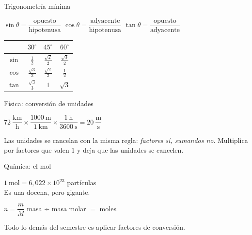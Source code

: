 \documentclass[12pt]{article}
\begin{document}
\begin{mwcarlamina}{Trigonometría mínima}
\begin{cajateoria}
  \centering
  $\sin\theta = \dfrac{\text{opuesto}}{\text{hipotenusa}}$\quad
  $\cos\theta = \dfrac{\text{adyacente}}{\text{hipotenusa}}$\quad
  $\tan\theta = \dfrac{\text{opuesto}}{\text{adyacente}}$
\end{cajateoria}
\begin{cajaformula}
  \centering\small
  \begin{tabular}{c|ccc}
    & $30^\circ$ & $45^\circ$ & $60^\circ$\\\hline
    $\sin$ & $\tfrac12$ & $\tfrac{\sqrt2}{2}$ & $\tfrac{\sqrt3}{2}$\\
    $\cos$ & $\tfrac{\sqrt3}{2}$ & $\tfrac{\sqrt2}{2}$ & $\tfrac12$\\
    $\tan$ & $\tfrac{\sqrt3}{3}$ & $1$ & $\sqrt3$
  \end{tabular}
\end{cajaformula}
\end{mwcarlamina}

\begin{mwcarlamina}{Física: conversión de unidades}
\begin{cajapasos}
  \centering
  $72\ \dfrac{\text{km}}{\text{h}} \times
   \dfrac{1000\ \text{m}}{1\ \text{km}} \times
   \dfrac{1\ \text{h}}{3600\ \text{s}} =
   20\ \dfrac{\text{m}}{\text{s}}$
\end{cajapasos}
\begin{cajateoria}
  \small Las unidades se cancelan con la misma regla:
  \emph{factores sí, sumandos no}. Multiplica por factores que
  valen 1 y deja que las unidades se cancelen.
\end{cajateoria}
\end{mwcarlamina}

\begin{mwcarlamina}{Química: el mol}
\begin{cajateoria}
  \centering
  $1\ \text{mol} = 6{,}022\times 10^{23}$ partículas\\[4pt]
  {\small Es una docena, pero gigante.}
\end{cajateoria}
\begin{cajapasos}
  \centering
  $n = \dfrac{m}{M}$\qquad
  {\small masa $\div$ masa molar $=$ moles}
\end{cajapasos}
\begin{cajaformula}
  \small Todo lo demás del semestre es aplicar factores de conversión.
\end{cajaformula}
\end{mwcarlamina}
\end{document}
